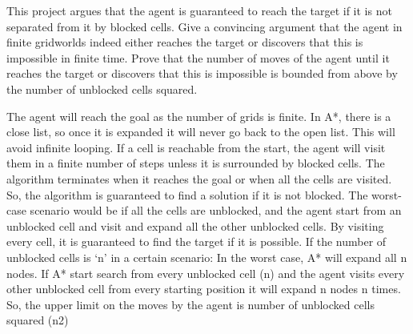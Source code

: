 \documentclass[12pt]{article}
\begin{document}
\begin{enumerate}[label=\alph*]
\begin{flushleft}
\begin{itshape}
  		This project argues that the agent is guaranteed to reach the target if it is not separated 
from it by blocked cells. Give a convincing argument that the agent in finite gridworlds indeed either reaches the target or discovers that this is impossible
in finite time. Prove that the number of moves of the agent until it reaches the target
or discovers that this is impossible is bounded from above by the number of
unblocked cells squared.
        \end{itshape}
       \vskip 0.5cm 
The agent will reach the goal as the number of grids is finite. 
In A*, there is a close list, so once it is expanded it will never go back to the open list. This will avoid infinite looping.
If a cell is reachable from the start, the agent will visit them in a finite number of steps unless it is surrounded by blocked cells. 
\vskip 0.1cm
The algorithm terminates when it reaches the goal or when all the cells are visited. So, the
algorithm is guaranteed to find a solution if it is not blocked.
The worst-case scenario would be if all the cells are unblocked, and the agent start from an unblocked cell and visit and expand all the other unblocked cells. By visiting every cell, it is guaranteed to find the target if it is possible.
\vskip 0.1cm
If the number of unblocked cells is ‘n’ in a certain scenario:
In the worst case, A* will expand all n nodes.  
If A* start search from every unblocked cell (n) and the agent visits every other unblocked cell from every starting position it will expand n nodes n times.
\vskip 0.1cm
So, the upper limit on the moves by the agent is number of unblocked cells squared (n2)
	\end{flushleft}
 \end{enumerate}
\end{document}
